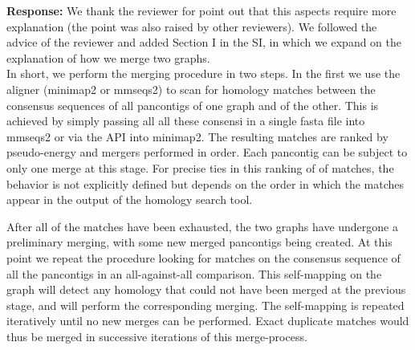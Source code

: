 \documentclass[aps,rmp,onecolumn]{revtex4-1}
\newcommand{\response}[1]{{\it {\color{response}\textbf{Response:} #1}}\vskip 5mm}
\begin{document}
\response{We thank the reviewer for point out that this aspects require more explanation (the point was also raised by other reviewers).
      We followed the advice of the reviewer and added Section I in the SI, in which we expand on the explanation of how we merge two graphs.\\
      In short, we perform the merging procedure in two steps. In the first we use the aligner (minimap2 or mmseqs2) to scan for homology matches between the consensus sequences of all pancontigs of one graph and of the other.
      This is achieved by simply passing all all these consensi in a single fasta file into mmseqs2 or via the API into minimap2.
      The resulting matches are ranked by pseudo-energy and mergers performed in order.
      Each pancontig can be subject to only one merge at this stage.
      For precise ties in this ranking of of matches, the behavior is not explicitly defined but depends on the order in which the matches appear in the output of the homology search tool.

      After all of the matches have been exhausted, the two graphs have undergone a preliminary merging, with some new merged pancontigs being created. At this point we repeat the procedure looking for matches on the consensus sequence of all the pancontigs in an all-against-all comparison. This self-mapping on the graph will detect any homology that could not have been merged at the previous stage, and will perform the corresponding merging. The self-mapping is repeated iteratively until no new merges can be performed.
      Exact duplicate matches would thus be merged in successive iterations of this merge-process.
}
\end{document}
